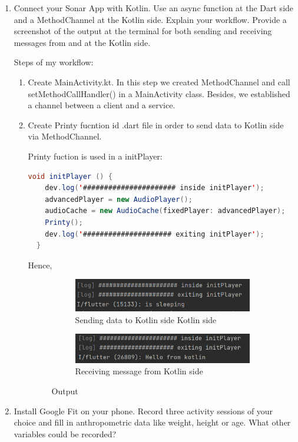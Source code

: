 \documentclass{homework}
\begin{document}
\exercise
\begin{enumerate}
	\item Connect your Sonar App with Kotlin. Use an async function at the Dart side and a MethodChannel at the Kotlin side. Explain your workflow. Provide a screenshot of the output at the terminal for both sending and receiving messages from and at the Kotlin side.

	Steps of my workflow:
	\begin{enumerate}
	\item Create MainActivity.kt. In this step we created MethodChannel and call setMethodCallHandler() in a MainActivity class. Besides, we established a channel between a client and a service.
	\item Create Printy fucntion id .dart file in order to send data to Kotlin side via MethodChannel.

	Printy fuction is used in a initPlayer:
	\begin{lstlisting}[language=Java, caption=Printy location in .dart file]
  void initPlayer () {
    dev.log('###################### inside initPlayer');
    advancedPlayer = new AudioPlayer();
    audioCache = new AudioCache(fixedPlayer: advancedPlayer);
    Printy();
    dev.log('##################### exiting initPlayer');
  }
	\end{lstlisting}
	Hence, 
	\begin{figure}[hbt!]
	\centering
		\begin{subfigure}[hbt!]{0.4\textwidth}
			\centering
			\includegraphics[width=\textwidth]{receive_kotlin_side.png}
			\caption{Sending data to Kotlin side Kotlin side}
		\end{subfigure}
		\hfill
		\begin{subfigure}[hbt!]{0.4\textwidth}
		         \centering
		         \includegraphics[width=\textwidth]{send_from_kotlin.png}
		         \caption{Receiving message from Kotlin side}
		     \end{subfigure}
		        \caption{Output}
		\end{figure}
		\end{enumerate}
	\item Install Google Fit on your phone. Record three activity sessions of your choice and fill in anthropometric data like weight, height or age. What other variables could be recorded?


\end{enumerate}
\end{document}
